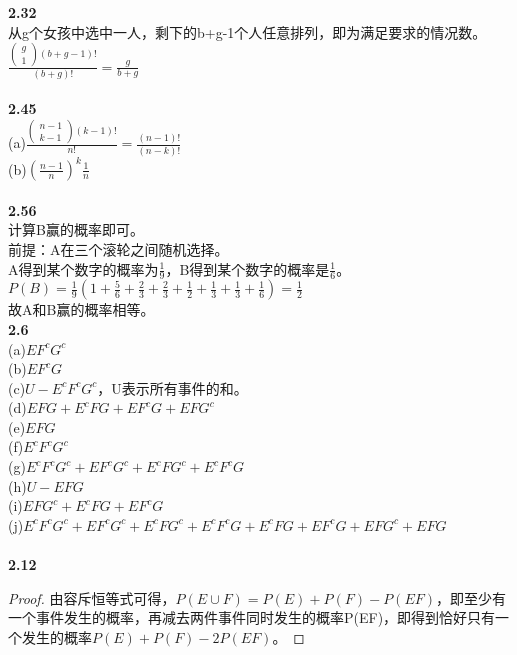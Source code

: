 \documentclass{book}%
\begin{document}
	{\bfseries 2.32}\\
	从g个女孩中选中一人，剩下的b+g-1个人任意排列，即为满足要求的情况数。\\
	$\frac{\begin{pmatrix}
			g\\1
		\end{pmatrix}(b+g-1)!}{(b+g)!}=\frac{g}{b+g}$\\
	~\\
	
	{\bfseries 2.45}\\
	(a)$\frac{\begin{pmatrix}
			n-1\\k-1
		\end{pmatrix}(k-1)!}{n!}=\frac{(n-1)!}{(n-k)!}$\\
	(b)$(\frac{n-1}{n})^{k}\frac{1}{n}$\\
	~\\
	
	{\bfseries 2.56}\\
	计算B赢的概率即可。\\
	前提：A在三个滚轮之间随机选择。\\
	A得到某个数字的概率为$\frac{1}{9}$，B得到某个数字的概率是$\frac{1}{6}$。\\
	$P(B)=\frac{1}{9}(1+\frac{5}{6}+\frac{2}{3}+\frac{2}{3}+\frac{1}{2}+\frac{1}{3}+\frac{1}{3}+\frac{1}{6})=\frac{1}{2}$\\
	故A和B赢的概率相等。
	~\\
	
	{\bfseries 2.6}\\
	(a)$EF^{c}G^{c}$\\
	(b)$EF^{c}G$\\
	(c)$U-E^{c}F^{c}G^{c}$，U表示所有事件的和。\\
	(d)$EFG+E^{c}FG+EF^{c}G+EFG^{c}$\\
	(e)$EFG$\\
	(f)$E^{c}F^{c}G^{c}$\\
	(g)$E^{c}F^{c}G^{c}+EF^{c}G^{c}+E^{c}FG^{c}+E^{c}F^{c}G$\\
	(h)$U-EFG$\\
	(i)$EFG^{c}+E^{c}FG+EF^{c}G$\\
	(j)$E^{c}F^{c}G^{c}+EF^{c}G^{c}+E^{c}FG^{c}+E^{c}F^{c}G+E^{c}FG+EF^{c}G+EFG^{c}+EFG$\\
	~\\
	
	{\bfseries 2.12}\\
	\begin{proof}
		由容斥恒等式可得，$P(E\cup F)=P(E)+P(F)-P(EF)$，即至少有一个事件发生的概率，再减去两件事件同时发生的概率P(EF)，即得到恰好只有一个发生的概率$P(E)+P(F)-2P(EF)$。
	\end{proof}
	
\end{document}

